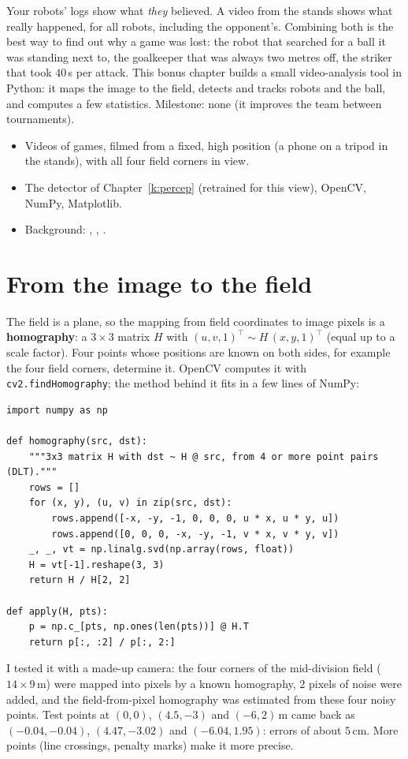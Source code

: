 \label{k:video}

Your robots' logs show what \emph{they} believed. A video from the stands shows what really happened, for all robots, including the opponent's. Combining both is the best way to find out why a game was lost: the robot that searched for a ball it was standing next to, the goalkeeper that was always two metres off, the striker that took $40$\,s per attack. This bonus chapter builds a small video-analysis tool in Python: it maps the image to the field, detects and tracks robots and the ball, and computes a few statistics. Milestone: none (it improves the team between tournaments).

\begin{needbox}
\begin{itemize}[nosep]
  \item Videos of games, filmed from a fixed, high position (a phone on a tripod in the stands), with all four field corners in view.
  \item The detector of Chapter~\ref{k:percep} (retrained for this view), OpenCV, NumPy, Matplotlib.
  \item Background: , , .
\end{itemize}
\end{needbox}

\section*{From the image to the field}
The field is a plane, so the mapping from field coordinates to image pixels is a \textbf{homography}: a $3\times3$ matrix $H$ with $(u,v,1)^\top\sim H\,(x,y,1)^\top$ (equal up to a scale factor). Four points whose positions are known on both sides, for example the four field corners, determine it. OpenCV computes it with \verb!cv2.findHomography!; the method behind it fits in a few lines of NumPy:
\begin{verbatim}
import numpy as np

def homography(src, dst):
    """3x3 matrix H with dst ~ H @ src, from 4 or more point pairs (DLT)."""
    rows = []
    for (x, y), (u, v) in zip(src, dst):
        rows.append([-x, -y, -1, 0, 0, 0, u * x, u * y, u])
        rows.append([0, 0, 0, -x, -y, -1, v * x, v * y, v])
    _, _, vt = np.linalg.svd(np.array(rows, float))
    H = vt[-1].reshape(3, 3)
    return H / H[2, 2]

def apply(H, pts):
    p = np.c_[pts, np.ones(len(pts))] @ H.T
    return p[:, :2] / p[:, 2:]
\end{verbatim}
I tested it with a made-up camera: the four corners of the mid-division field ($14\times9$\,m) were mapped into pixels by a known homography, $2$ pixels of noise were added, and the field-from-pixel homography was estimated from these four noisy points. Test points at $(0,0)$, $(4.5,-3)$ and $(-6,2)$\,m came back as $(-0.04,-0.04)$, $(4.47,-3.02)$ and $(-6.04,1.95)$: errors of about $5$\,cm. More points (line crossings, penalty marks) make it more precise.

